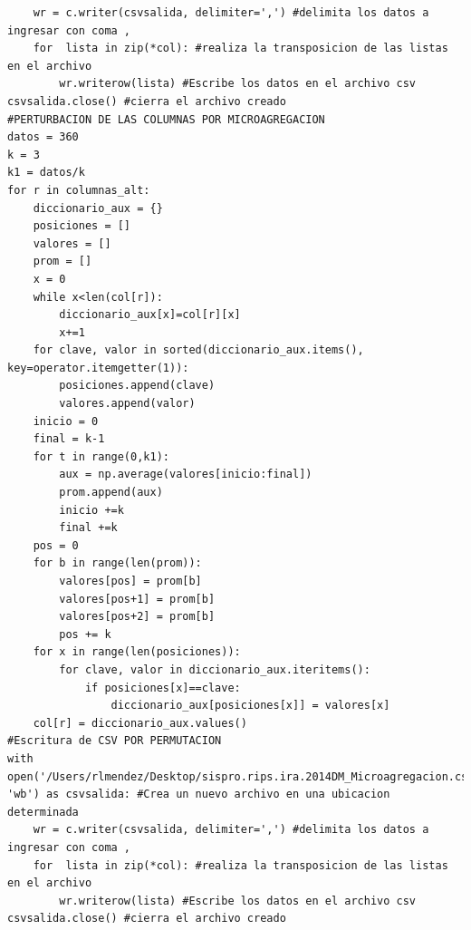 \documentclass[a4paper,openright,12pt]{book}
\theoremstyle{definition}
\theoremstyle{remark}
\begin{document}
\begin{verbatim}
	wr = c.writer(csvsalida, delimiter=',') #delimita los datos a ingresar con coma ,
	for  lista in zip(*col): #realiza la transposicion de las listas en el archivo
		wr.writerow(lista) #Escribe los datos en el archivo csv
csvsalida.close() #cierra el archivo creado
#PERTURBACION DE LAS COLUMNAS POR MICROAGREGACION
datos = 360
k = 3
k1 = datos/k
for r in columnas_alt:
	diccionario_aux = {}
	posiciones = []
	valores = []
	prom = []
	x = 0
	while x<len(col[r]):
		diccionario_aux[x]=col[r][x]
		x+=1
	for clave, valor in sorted(diccionario_aux.items(), key=operator.itemgetter(1)):
		posiciones.append(clave)
		valores.append(valor)	
	inicio = 0
	final = k-1
	for t in range(0,k1):
		aux = np.average(valores[inicio:final])
		prom.append(aux)
		inicio +=k
		final +=k
	pos = 0
	for b in range(len(prom)):
		valores[pos] = prom[b]
		valores[pos+1] = prom[b]
		valores[pos+2] = prom[b]
		pos += k
	for x in range(len(posiciones)):
		for clave, valor in diccionario_aux.iteritems():
			if posiciones[x]==clave:
				diccionario_aux[posiciones[x]] = valores[x]
	col[r] = diccionario_aux.values()
#Escritura de CSV POR PERMUTACION
with open('/Users/rlmendez/Desktop/sispro.rips.ira.2014DM_Microagregacion.csv', 'wb') as csvsalida: #Crea un nuevo archivo en una ubicacion determinada
	wr = c.writer(csvsalida, delimiter=',') #delimita los datos a ingresar con coma ,
	for  lista in zip(*col): #realiza la transposicion de las listas en el archivo
		wr.writerow(lista) #Escribe los datos en el archivo csv
csvsalida.close() #cierra el archivo creado
\end{verbatim}
\end{document}
